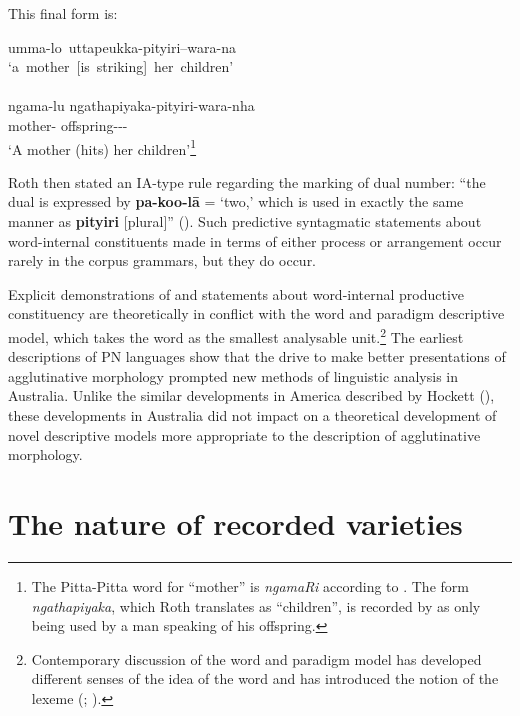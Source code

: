 This final form is:

\ea
 \gll \mbox{umma-lo uttapeukka-pityiri–wara-na}\\
 \mbox{`a mother [is striking] her children'} \\
 \glt \citep[8]{roth_ethnological_1897}\\
 \gll ngama-lu ngathapiyaka-pityiri-wara-nha\\
 mother-	offspring---\\
 \glt `A mother  (hits) her children'\footnote{The Pitta-Pitta word for “mother” is \textit{ngamaRi} according to \citet[234]{blake_pitta_1979}. The form \textit{ngathapiyaka}, which Roth translates as “children”, is recorded by \citet[235]{blake_pitta_1979} as only being used by a man speaking of his offspring. }
\z

Roth then stated an IA-type rule regarding the marking of dual number: “the dual is expressed by \textbf{pa-koo-lā} = `two,' which is used in exactly the same manner as \textbf{pityiri }[plural]” (\citealt[8]{roth_ethnological_1897}). Such predictive syntagmatic statements about word-internal constituents made in terms of either process or arrangement occur rarely in the corpus grammars, but they do occur.

\hspace*{-.4pt}Explicit demonstrations of and statements about word-internal productive constituency are theoretically in conflict with the word and paradigm descriptive model, which takes the word as the smallest analysable unit.\footnote{Contemporary discussion of the word and paradigm model has developed different senses of the idea of the word and has introduced the notion of the lexeme (\citealt{koch_australian_1990}; \citealt{aronoff_morphology_1994}).} The earliest descriptions of PN languages show that the drive to make better presentations of agglutinative morphology prompted new methods of linguistic analysis in Australia. Unlike the similar developments in America described by Hockett (\citealt[111]{hockett_two_1954}), these developments in Australia did not impact on a theoretical development of novel descriptive models more appropriate to the description of agglutinative morphology.

\section{The nature of recorded varieties}
\label{sec:key:2.5}

